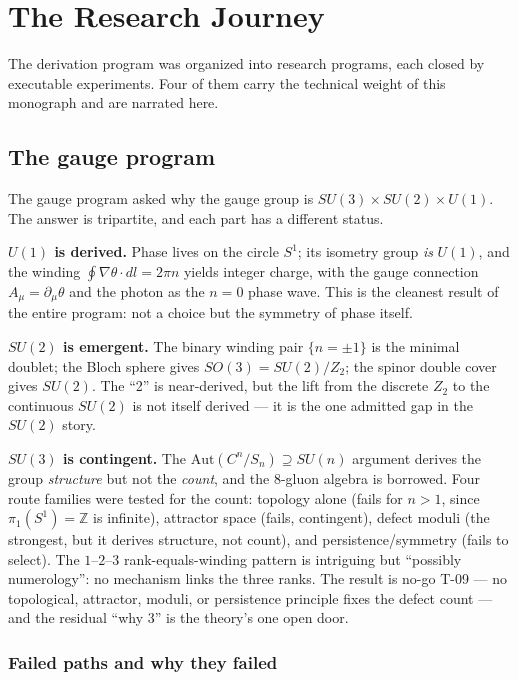 \documentclass[10pt,twoside,openany]{book}
\begin{document}
\chapter{The Research Journey}
\label{ch:journey}

The derivation program was organized into research programs, each closed by executable
experiments. Four of them carry the technical weight of this monograph and are narrated
here.

\section{The gauge program}

The gauge program asked why the gauge group is $SU(3)\times SU(2)\times U(1)$. The answer
is tripartite, and each part has a different status.

\textbf{$U(1)$ is derived.} Phase lives on the circle $S^1$; its isometry group \emph{is}
$U(1)$, and the winding $\oint\nabla\theta\cdot dl=2\pi n$ yields integer charge, with the
gauge connection $A_\mu=\partial_\mu\theta$ and the photon as the $n=0$ phase wave. This is
the cleanest result of the entire program: not a choice but the symmetry of phase itself.

\textbf{$SU(2)$ is emergent.} The binary winding pair $\{n=\pm1\}$ is the minimal doublet;
the Bloch sphere gives $SO(3)=SU(2)/Z_2$; the spinor double cover gives $SU(2)$. The
``2'' is near-derived, but the lift from the discrete $Z_2$ to the continuous $SU(2)$ is
not itself derived --- it is the one admitted gap in the $SU(2)$ story.

\textbf{$SU(3)$ is contingent.} The $\mathrm{Aut}(C^n/S_n)\supseteq SU(n)$ argument derives
the group \emph{structure} but not the \emph{count}, and the 8-gluon algebra is borrowed.
Four route families were tested for the count: topology alone (fails for $n>1$, since
$\pi_1(S^1)=\mathbb Z$ is infinite), attractor space (fails, contingent), defect moduli
(the strongest, but it derives structure, not count), and persistence/symmetry (fails to
select). The $1$--$2$--$3$ rank-equals-winding pattern is intriguing but ``possibly
numerology'': no mechanism links the three ranks. The result is no-go T-09 --- no
topological, attractor, moduli, or persistence principle fixes the defect count --- and
the residual ``why 3'' is the theory's one open door.

\subsection{Failed paths and why they failed}
\end{document}
